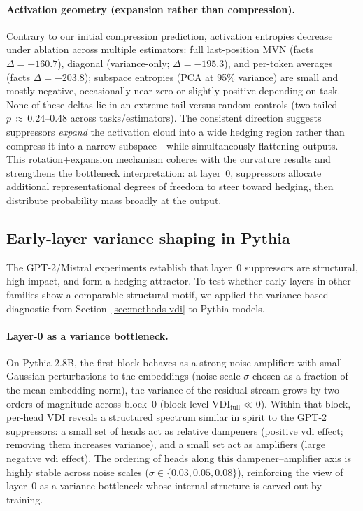 \paragraph{Activation geometry (expansion rather than compression).} Contrary to our initial compression prediction, activation entropies decrease under ablation across multiple estimators: full last-position MVN (facts $\Delta = -160.7$), diagonal (variance-only; $\Delta = -195.3$), and per-token averages (facts $\Delta = -203.8$); subspace entropies (PCA at 95\% variance) are small and mostly negative, occasionally near-zero or slightly positive depending on task. None of these deltas lie in an extreme tail versus random controls (two‑tailed $p\,\approx\,0.24$–$0.48$ across tasks/estimators). The consistent direction suggests suppressors \emph{expand} the activation cloud into a wide hedging region rather than compress it into a narrow subspace—while simultaneously flattening outputs. This rotation+expansion mechanism coheres with the curvature results and strengthens the bottleneck interpretation: at layer~0, suppressors allocate additional representational degrees of freedom to steer toward hedging, then distribute probability mass broadly at the output.

\subsection{Early-layer variance shaping in Pythia}\label{sec:pythia-vdi}
The GPT-2/Mistral experiments establish that layer~0 suppressors are structural, high-impact, and form a hedging attractor.
To test whether early layers in other families show a comparable structural motif, we applied the variance-based diagnostic from Section~\ref{sec:methods-vdi} to Pythia models.

\paragraph{Layer-0 as a variance bottleneck.}
On Pythia-2.8B, the first block behaves as a strong noise amplifier: with small Gaussian perturbations to the embeddings (noise scale $\sigma$ chosen as a fraction of the mean embedding norm), the variance of the residual stream grows by two orders of magnitude across block~0 (block-level $\mathrm{VDI}_\text{full} \ll 0$).
Within that block, per-head VDI reveals a structured spectrum similar in spirit to the GPT-2 suppressors: a small set of heads act as relative dampeners (positive $\mathrm{vdi\_effect}$; removing them increases variance), and a small set act as amplifiers (large negative $\mathrm{vdi\_effect}$).
The ordering of heads along this dampener–amplifier axis is highly stable across noise scales ($\sigma\in\{0.03,0.05,0.08\}$), reinforcing the view of layer~0 as a variance bottleneck whose internal structure is carved out by training.

